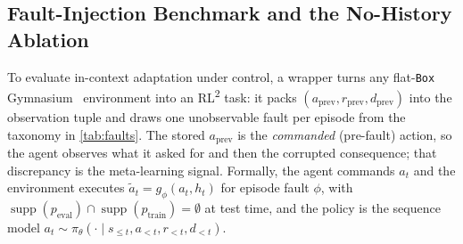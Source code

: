 \documentclass[conference]{IEEEtran}
\newcommand{\rltwo}{\texorpdfstring{RL\textsuperscript{2}}{RL2}}
\begin{document}
\subsection{Fault-Injection Benchmark and the No-History Ablation}
\label{sec:benchmark}
To evaluate in-context adaptation under control, a wrapper turns any flat-\texttt{Box} Gymnasium~\cite{gymnasium} environment into an \rltwo{} task: it packs $(a_{\text{prev}}, r_{\text{prev}}, d_{\text{prev}})$ into the observation tuple and draws one unobservable fault per episode from the taxonomy in \cref{tab:faults}. The stored $a_{\text{prev}}$ is the \emph{commanded} (pre-fault) action, so the agent observes what it asked for and then the corrupted consequence; that discrepancy is the meta-learning signal. Formally, the agent commands $a_t$ and the environment executes $\tilde{a}_t = g_\phi(a_t, h_t)$ for episode fault $\phi$, with $\operatorname{supp}(p_{\text{eval}}) \cap \operatorname{supp}(p_{\text{train}}) = \emptyset$ at test time, and the policy is the sequence model $a_t \sim \pi_\theta(\cdot \mid s_{\leq t}, a_{<t}, r_{<t}, d_{<t})$.

\begin{table}[!t]
\centering
\caption{Fault taxonomy. Severity $s \in [0,1]$; experiments use $s=1$. Faults are resampled each episode and are not observable.}
\label{tab:faults}
\end{table}
\end{document}
